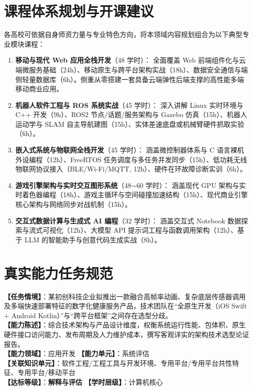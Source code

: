 \section{课程体系规划与开课建议}

各高校可依据自身师资力量与专业特色方向，将本领域内容规划组合为以下典型专业模块课程：
\begin{enumerate}
    \item \textbf{移动与现代 Web 应用全栈开发}（48 学时）：
    全面覆盖 Web 前端组件化与云端微服务基础（24h）、移动原生与跨平台架构实战（18h）、数据安全通信与端侧轻量数据库（6h）。侧重从零搭建一套具备云端弹性后端支撑的高性能多端移动商业应用。
    \item \textbf{机器人软件工程与 ROS 系统实战}（45 学时）：
    深入讲解 Linux 实时环境与 C++ 开发（9h）、ROS2 节点/话题/服务架构与 Gazebo 仿真（15h）、机器人运动学与 SLAM 自主导航建图（15h）、实体差速底盘或机械臂硬件抓取实验（6h）。
    \item \textbf{嵌入式系统与物联网全栈开发}（45 学时）：
    涵盖微控制器体系与 C 语言裸机外设编程（12h）、FreeRTOS 任务调度与多任务并发同步（15h）、低功耗无线物联网协议接入（BLE/Wi-Fi/MQTT, 12h）、硬件在环故障诊断实训（6h）。
    \item \textbf{游戏引擎架构与实时交互图形系统}（48$\sim$60 学时）：
    涵盖现代 GPU 架构与实时着色器编程（18h）、游戏主循环与空间碰撞加速结构（15h）、现代商业引擎核心架构与网络同步对战机制（15h）。
    \item \textbf{交互式数据计算与生成式 AI 编程}（32 学时）：
    涵盖交互式 Notebook 数据探索与流式可视化（12h）、大模型 API 提示词工程与函数调用架构（12h）、基于 LLM 的智能助手与创意代码生成实战（8h）。
\end{enumerate}

\section{真实能力任务规范}

\begin{taskbox}[任务 1：原生开发与跨平台技术选型决策评估]
\textbf{【任务情境】}：某初创科技企业拟推出一款融合高帧率动画、复杂底层传感器调用及多端快速部署特征的数字化健康服务产品，技术团队在“全原生开发（iOS Swift + Android Kotlin）”与“跨平台框架”之间存在选型分歧。\\
\textbf{【能力陈述】}：综合技术架构与产品设计维度，权衡系统运行性能、包体积、原生硬件接口访问能力、发布周期及人力维护成本，撰写客观详实的架构技术选型论证报告。\\
\textbf{【能力领域】}：应用开发 \quad \textbf{【能力单元】}：系统评估\\
\textbf{【关联知识单元】}：软件工程/工程工具与开发环境、专用平台/专用平台共性特征、专用平台/移动平台\\
\textbf{【达标等级】}：\textbf{解释与评估} \quad \textbf{【学时层级】}：计算机核心
\end{taskbox}

